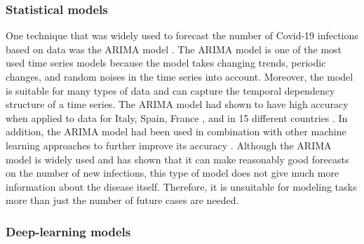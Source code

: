 \subsubsection{Statistical models}

One technique that was widely used to forecast the number of Covid-19 infections based on data was the \gls{ARIMA} model \cite{box2015time}.
The \gls{ARIMA} model is one of the most used time series models because the model takes changing trends, periodic changes, and random noises in the time series into account.
Moreover, the model is suitable for many types of data and can capture the temporal dependency structure of a time series.
The \gls{ARIMA} model had shown to have high accuracy when applied to data for Italy, Spain, France \cite{ceylanEstimationCOVID19Prevalence2020}, and in 15 different countries \cite{singhPredictionCOVID19Pandemic2020}.
In addition, the \gls{ARIMA} model had been used in combination with other machine learning approaches to further improve its accuracy \cite{ribeiroShorttermForecastingCOVID192020}.
Although the \gls{ARIMA} model is widely used and has shown that it can make reasonably good forecasts on the number of new infections, this type of model does not give much more information about the disease itself.
Therefore, it is unsuitable for modeling tasks more than just the number of future cases are needed.

\subsubsection{Deep-learning models}

